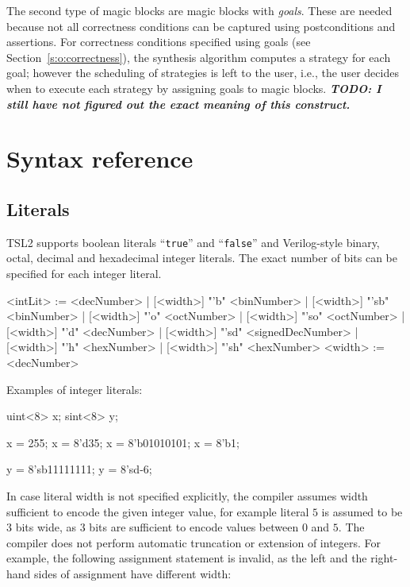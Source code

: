 \documentclass{report}
\newcommand{\src}[1]{\texttt{#1}}
\newcommand{\tsl}{TSL2 }
\newcommand{\comment}[1]{{\textit{\textbf{#1}}}}
\begin{document}
The second type of magic blocks are magic blocks with 
\emph{goals}.  These are needed because not all correctness 
conditions can be captured using postconditions and assertions.  
For correctness conditions specified using goals (see 
Section~\ref{s:o:correctness}), the synthesis algorithm computes a 
strategy for each goal; however the scheduling of strategies is 
left to the user, i.e., the user decides when to execute each 
strategy by assigning goals to magic blocks. \comment{TODO: I 
still have not figured out the exact meaning of this construct.}


\chapter{Syntax reference}

\section{Literals}\label{s:r:literals}

\tsl supports boolean literals ``\src{true}'' and ``\src{false}'' 
and Verilog-style binary, octal, decimal and hexadecimal integer 
literals.  The exact number of bits can be specified for each 
integer literal.  

\begin{bnflisting}{}
<intLit> := <decNumber>
          | [<width>] "'b"  <binNumber>
          | [<width>] "'sb" <binNumber>
          | [<width>] "'o"  <octNumber>
          | [<width>] "'so" <octNumber>
          | [<width>] "'d"  <decNumber>
          | [<width>] "'sd" <signedDecNumber>
          | [<width>] "'h"  <hexNumber>
          | [<width>] "'sh" <hexNumber>
<width> := <decNumber>
\end{bnflisting}

Examples of integer literals:
\begin{tsllisting}{}
uint<8> x;
sint<8> y;

x = 255;
x = 8'd35;
x = 8'b01010101;
x = 8'b1;

y = 8'sb11111111;
y = 8'sd-6;
\end{tsllisting}

In case literal width is not specified explicitly, the compiler 
assumes width sufficient to encode the given integer value, for 
example literal $5$ is assumed to be $3$ bits wide, as $3$ bits 
are sufficient to encode values between $0$ and $5$.  The compiler 
does not perform automatic truncation or extension of integers.  
For example, the following assignment statement is invalid, as the 
left and the right-hand sides of assignment have different width:
\end{document}
